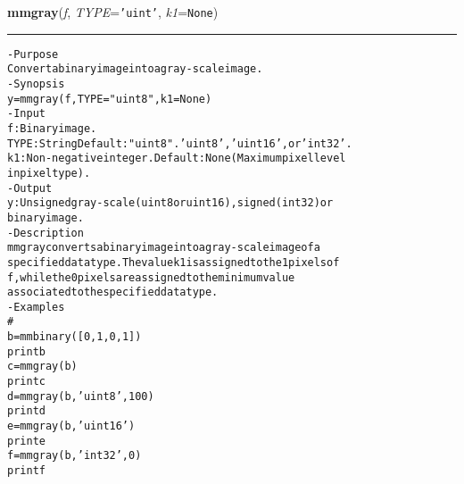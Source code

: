     \label{multireg:num_pymorph:mmgray}
    \vspace{0.5ex}

    \begin{boxedminipage}{\textwidth}

    \raggedright \textbf{mmgray}(\textit{f}, \textit{TYPE}=\texttt{'\-u\-i\-n\-t\-'\-}, \textit{k1}=\texttt{N\-o\-n\-e\-})

    \vspace{-1.5ex}

    \rule{\textwidth}{0.5\fboxrule}
\begin{alltt}
- Purpose
    Convert a binary image into a gray-scale image.
- Synopsis
    y = mmgray(f, TYPE="uint8", k1=None)
- Input
    f:    Binary image.
    TYPE: String Default: "uint8". 'uint8', 'uint16', or 'int32'.
    k1:   Non-negative integer. Default: None (Maximum pixel level
          in pixel type).
- Output
    y: Unsigned gray-scale (uint8 or uint16), signed (int32) or
       binary image.
- Description
    mmgray converts a binary image into a gray-scale image of a
    specified data type. The value k1 is assigned to the 1 pixels of
    f , while the 0 pixels are assigned to the minimum value
    associated to the specified data type.
- Examples
    \#
    b=mmbinary([0, 1, 0, 1])
    print b
    c=mmgray(b)
    print c
    d=mmgray(b,'uint8',100)
    print d
    e=mmgray(b,'uint16')
    print e
    f=mmgray(b,'int32',0)
    print f\end{alltt}

    \vspace{1ex}

    \end{boxedminipage}

    \label{multireg:num_pymorph:mmgshow}
    \vspace{0.5ex}


